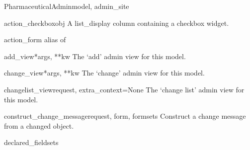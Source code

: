 \documentclass[letterpaper,10pt,english]{sphinxmanual}
\begin{document}
\hypertarget{data.admin.PharmaceuticalAdmin}{}\begin{classdesc}{PharmaceuticalAdmin}{model, admin\_site}~

\hypertarget{data.admin.PharmaceuticalAdmin.action_checkbox}{}\begin{methoddesc}{action\_checkbox}{obj}
A list\_display column containing a checkbox widget.
\end{methoddesc}

\hypertarget{data.admin.PharmaceuticalAdmin.action_form}{}\begin{memberdesc}{action\_form}
alias of 
\end{memberdesc}

\hypertarget{data.admin.PharmaceuticalAdmin.add_view}{}\begin{methoddesc}{add\_view}{*args, **kw}
The `add' admin view for this model.
\end{methoddesc}

\hypertarget{data.admin.PharmaceuticalAdmin.change_view}{}\begin{methoddesc}{change\_view}{*args, **kw}
The `change' admin view for this model.
\end{methoddesc}

\hypertarget{data.admin.PharmaceuticalAdmin.changelist_view}{}\begin{methoddesc}{changelist\_view}{request, extra\_context=None}
The `change list' admin view for this model.
\end{methoddesc}

\hypertarget{data.admin.PharmaceuticalAdmin.construct_change_message}{}\begin{methoddesc}{construct\_change\_message}{request, form, formsets}
Construct a change message from a changed object.
\end{methoddesc}

\hypertarget{data.admin.PharmaceuticalAdmin.declared_fieldsets}{}\begin{memberdesc}{declared\_fieldsets}\end{memberdesc}


\end{classdesc}
\end{document}
